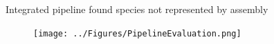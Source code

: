 \documentclass{beamer}
\begin{document}



\begin{frame}{Integrated pipeline found species not represented by assembly}
    \begin{figure}
        \centering
        \texttt{[image: ../Figures/PipelineEvaluation.png]}
    \end{figure}
\end{frame}
\end{document}
